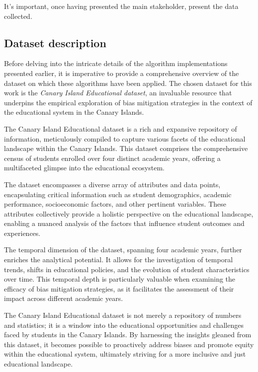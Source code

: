 It's important, once having presented the main stakeholder, present the data collected.

\subsection{Dataset description}

Before delving into the intricate details of the algorithm implementations presented earlier, it is imperative to provide a comprehensive overview of the dataset on which these algorithms have been applied. The chosen dataset for this work is the \emph{Canary Island Educational dataset}, an invaluable resource that underpins the empirical exploration of bias mitigation strategies in the context of the educational system in the Canary Islands. 

The Canary Island Educational dataset is a rich and expansive repository of information, meticulously compiled to capture various facets of the educational landscape within the Canary Islands. This dataset comprises the comprehensive census of students enrolled over four distinct academic years, offering a multifaceted glimpse into the educational ecosystem. 

The dataset encompasses a diverse array of attributes and data points, encapsulating critical information such as student demographics, academic performance, socioeconomic factors, and other pertinent variables. These attributes collectively provide a holistic perspective on the educational landscape, enabling a nuanced analysis of the factors that influence student outcomes and experiences. 

The temporal dimension of the dataset, spanning four academic years, further enriches the analytical potential. It allows for the investigation of temporal trends, shifts in educational policies, and the evolution of student characteristics over time. This temporal depth is particularly valuable when examining the efficacy of bias mitigation strategies, as it facilitates the assessment of their impact across different academic years. 

The Canary Island Educational dataset is not merely a repository of numbers and statistics; it is a window into the educational opportunities and challenges faced by students in the Canary Islands. By harnessing the insights gleaned from this dataset, it becomes possible to proactively address biases and promote equity within the educational system, ultimately striving for a more inclusive and just educational landscape.

